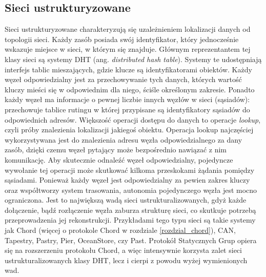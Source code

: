 \documentclass[12pt, twoside, openany]{report}
\begin{document}
\subsection{Sieci ustrukturyzowane}
Sieci ustrukturyzowane charakteryzują się uzależnieniem lokalizacji danych od topologii sieci. Każdy zasób posiada swój identyfikator, który jednocześnie wskazuje miejsce w sieci, w którym się znajduje. Głównym reprezentantem tej klasy sieci są systemy DHT (ang. \textit{distributed hash table}). Systemy te udostępniają interfejs tablic mieszających, gdzie klucze są identyfikatorami obiektów. Każdy węzeł odpowiedzialny jest za przechowywanie tych danych, których wartość kluczy mieści się w odpowiednim dla niego, ściśle określonym zakresie. Ponadto każdy węzeł ma informacje o pewnej liczbie innych węzłów w sieci (sąsiadów): przechowuje tablice rutingu w której przypisane są identyfikatory sąsiadów do odpowiednich adresów. Większość operacji dostępu do danych to operacje \textit{lookup}, czyli próby znalezienia lokalizacji jakiegoś obiektu. Operacja lookup najczęściej wykorzystywana jest do znalezienia adresu węzła odpowiedzialnego za dany zasób, dzięki czemu węzeł pytający może bezpośrednio nawiązać z nim komunikację. Aby skutecznie odnaleźć węzeł odpowiedzialny, pojedyncze wywołanie tej operacji może skutkować kilkoma przeskokami żądania pomiędzy sąsiadami. Ponieważ każdy węzeł jest odpowiedzialny za pewien zakres kluczy oraz współtworzy system trasowania, autonomia pojedynczego węzła jest mocno ograniczona. Jest to największą wadą sieci ustrukturalizowanych, gdyż każde dołączenie, bądź rozłączenie węzła zaburza strukturę sieci, co skutkuje potrzebą przeprowadzenia jej rekonstrukcji. Przykładami tego typu sieci są takie systemy jak Chord (więcej o protokole Chord w rozdziale \ref{rozdzial_chord}), CAN, Tapestry, Pastry, Pier, OceanStore, czy Past. Protokół Statycznych Grup opiera się na rozszerzeniu protokołu Chord, a więc intensywnie korzysta zalet sieci ustrukturalizowanych klasy DHT, lecz i cierpi z powodu wyżej wymienionych wad.
\end{document}
